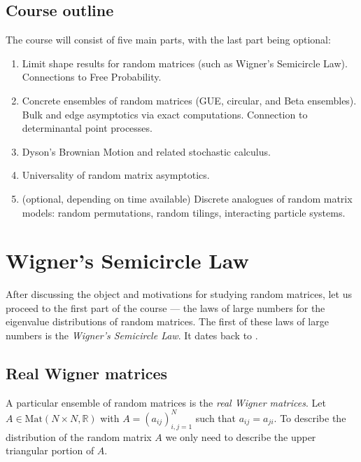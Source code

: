 \documentclass[letterpaper,11pt,oneside,reqno]{amsart}
\numberwithin{equation}{section}
\theoremstyle{definition}
\begin{document}

\subsection{Course outline} %
\label{sub:goals_for_the_course}

The course will consist of five main parts, with the last part being optional:

\begin{enumerate}[\bf1.]
	\item Limit shape results for random matrices (such as Wigner's Semicircle Law). Connections to Free Probability.
	\item Concrete ensembles of random matrices (GUE, circular, and Beta ensembles). Bulk and edge asymptotics via exact computations. Connection to determinantal point processes.
	\item Dyson's Brownian Motion and related stochastic calculus.
	\item Universality of random matrix asymptotics.
	\item (optional, depending on time available) Discrete analogues of random matrix models: random permutations, random tilings, interacting particle systems.
\end{enumerate}



\section{Wigner's Semicircle Law} %
\label{sec:wigner_s_semicircle_law}

After discussing the object and motivations for studying random matrices, let
us proceed to the first part of the course --- the laws of large numbers
for the eigenvalue distributions of random matrices. 
The first of these laws of large numbers is the 
\emph{Wigner's Semicircle Law}. It dates back to 
\cite{wigner1955characteristic}.

\subsection{Real Wigner matrices} %
\label{sub:real_wigner_matrices}

A particular ensemble of random matrices is the \emph{real Wigner matrices}.
Let $A\in \mathrm{Mat}(N\times N,\mathbb R)$ with $A=(a_{ij})_{i,j=1}^N$ such
that $a_{ij}=a_{ji}$. To describe the distribution of the random matrix $A$ we only need to
describe the upper triangular portion of $A$.
\end{document}
